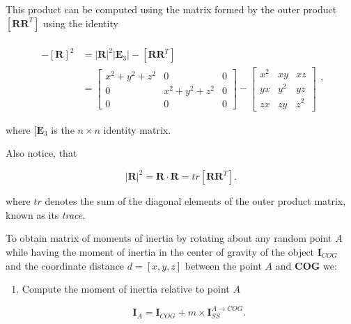\documentclass[10pt,b5paper,titlepage]{book}
\begin{document}
\begin{itemize}
        This product can be computed using the matrix formed by the outer product
        $[\mathbf{R} \mathbf{R}^{T}]$ using the identity

        \begin{equation}
            \begin{array}{ll}
                 \\
                -[\mathbf{R}]^{2}
                &= |\mathbf{R}|^{2}|\mathbf{E}_{3}| - [\mathbf{R}\mathbf{R}^{T}] \\
                &= \begin{bmatrix}
                    x^{2} + y^{2} + z^{2} & 0 & 0 \\
                    0 & x^{2} + y^{2} + z^{2} & 0 \\
                    0 & 0 & 0
                \end{bmatrix} - \begin{bmatrix}
                    x^{2} & xy & xz \\
                    yx & y^{2} & yz \\
                    zx & zy & z^{2}
                \end{bmatrix}
            \end{array}
        ,\end{equation}

        where $[\mathbf{E}_{3}$ is the $n \times n$  identity matrix.

        Also notice, that

        \begin{equation}
            |\mathbf{R}|^{2} = \mathbf{R} \cdot \mathbf{R} = tr [\mathbf{R}\mathbf{R}^{T}]
        .\end{equation}

        where $tr$ denotes the sum of the diagonal elements of the outer product
        matrix, known as its \textit{trace}.

        To obtain matrix of moments of inertia by rotating about any random
        point $A$ while having the moment of inertia in the center of gravity of
        the object $\mathbf{I}_{COG}$ and the coordinate distance $d = [x, y, z]$
        between the point $A$ and \textbf{COG} we:

        \begin{enumerate}
            \item Compute the moment of inertia relative to point $A$

                 \begin{equation}
                    \mathbf{I}_{A} = \mathbf{I}_{COG} + m \times \mathbf{I}_{SS}^{A \to COG}
                .\end{equation}


\end{enumerate}
\end{itemize}
\end{document}
